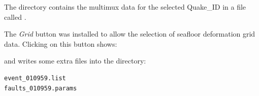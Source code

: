 \documentclass{manual}
\begin{document}
The  directory contains the multimux data for the selected Quake_ID in a file called .

\pagebreak

The \emph{Grid} button was installed to allow the selection of seafloor deformation grid data.
Clicking on this button shows:

\begin{figure}[ht]
  \centerline{}
  \label{fig:event6}
\end{figure}

and writes some extra files into the  directory:

\begin{verbatim}
event_010959.list
faults_010959.params
\end{verbatim}
\end{document}
